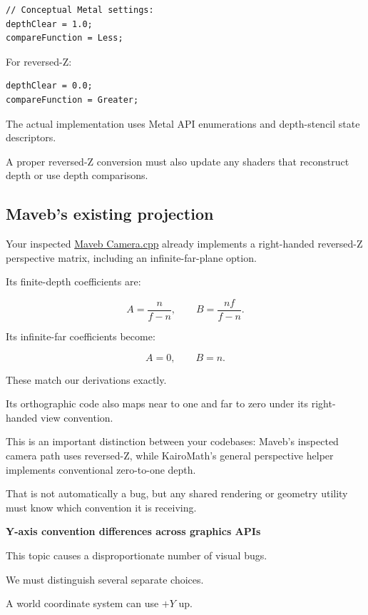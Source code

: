\begin{verbatim}
// Conceptual Metal settings:
depthClear = 1.0;
compareFunction = Less;
\end{verbatim}

For reversed-Z:

\begin{verbatim}
depthClear = 0.0;
compareFunction = Greater;
\end{verbatim}

The actual implementation uses Metal API enumerations and depth-stencil state descriptors.

A proper reversed-Z conversion must also update any shaders that reconstruct depth or use depth comparisons.

\subsection{Maveb's existing projection}\label{02-foundations-ii-ch033-mavebs-existing-projection}

Your inspected \href{https://github.com/swayam8624/Maveb/blob/main/engine/scene/src/Camera.cpp?utm_source=chatgpt.com}{Maveb Camera.cpp} already implements a right-handed reversed-Z perspective matrix, including an infinite-far-plane option.

Its finite-depth coefficients are:

\[
 \boxed{ A=\frac n{f-n}, \qquad B=\frac{nf}{f-n} }.
\]

Its infinite-far coefficients become:

\[
 \boxed{ A=0,\qquad B=n }.
\]

These match our derivations exactly.

Its orthographic code also maps near to one and far to zero under its right-handed view convention.

This is an important distinction between your codebases: Maveb's inspected camera path uses reversed-Z, while KairoMath's general perspective helper implements conventional zero-to-one depth.

That is not automatically a bug, but any shared rendering or geometry utility must know which convention it is receiving.

\textbf{Y-axis convention differences across graphics APIs}

This topic causes a disproportionate number of visual bugs.

We must distinguish several separate choices.

A world coordinate system can use \(+Y\) up.

